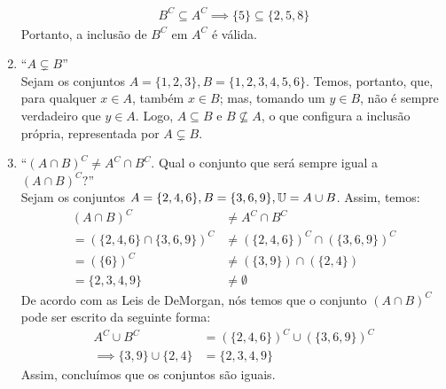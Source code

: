 \begin{enumerate}
        \begin{align*}
            B^C \subseteq A^C \implies \{5\} \subseteq \{2, 5, 8\}
        \end{align*}
        Portanto, a inclusão de $B^C$ em $A^C$ é válida.
        \item \enquote{$A \subsetneq B$} \\
        Sejam os conjuntos $A = \{1, 2, 3\}, B = \{1, 2, 3, 4, 5, 6\}$. Temos, portanto, que, para qualquer $x \in A$, também $x \in B$; mas, tomando um $y \in B$, não é sempre verdadeiro que $y \in A$. Logo, $A \subseteq B$ e $B \nsubseteq A$, o que configura a inclusão própria, representada por $A \subsetneq B$.
        \item \enquote{$(A \cap B)^C \ne A^C \cap B^C$. Qual o conjunto que será sempre igual a $(A \cap B)^C?$} \\
        Sejam os conjuntos $A = \{2, 4, 6\}, B = \{3, 6, 9\}, \mathbb U = A \cup B$. Assim, temos:
        \begin{align*}
        (A \cap B)^C &\ne A^C \cap B^C \\ =
            (\{2, 4, 6\} \cap \{3, 6, 9\})^C &\ne (\{2, 4, 6\})^C \cap (\{3, 6, 9\})^C \\
            =
            (\{6\})^C &\ne (\{3, 9\}) \cap (\{2, 4\}) \\ =
            \{2, 3, 4, 9\} &\ne \emptyset
        \end{align*}
        De acordo com as Leis de DeMorgan, nós temos que o conjunto $(A \cap B)^C$ pode ser escrito da seguinte forma:
        \begin{align*}
            A^C \cup B^C &= (\{2, 4, 6\})^C \cup (\{3, 6, 9\})^C \\ \implies
            \{3, 9\} \cup \{2, 4\} &= \{2, 3, 4, 9\}
        \end{align*}
        Assim, concluímos que os conjuntos são iguais.
    \end{enumerate}